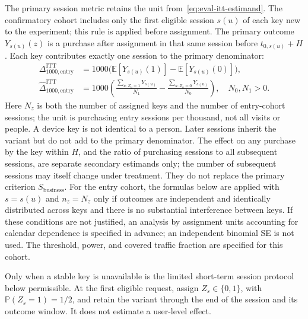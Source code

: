 \documentclass[12pt,a4paper]{article}
\newcommand{\E}{\mathbb E}
\newcommand{\Prob}{\mathbb P}
\theoremstyle{plainru}
\begin{document}
The primary session metric retains the unit from~\eqref{eq:eval-itt-estimand}.
The confirmatory cohort includes only the first eligible session
$s(u)$ of each key new to the experiment; this rule is applied
before assignment. The primary outcome $Y_{s(u)}(z)$ is a purchase after assignment
in that same session before $t_{0,s(u)}+H$. Each key contributes exactly one
session to the primary denominator:
\begin{align}\label{eq:eval-unit-itt}
\Delta_{1000,\mathrm{entry}}^{\mathrm{ITT}}
&=1000\bigl(\E[Y_{s(u)}(1)]-\E[Y_{s(u)}(0)]\bigr),\nonumber\\
\widehat\Delta_{1000,\mathrm{entry}}^{\mathrm{ITT}}
&=1000\left(\frac{\sum_{u:Z_u=1}Y_{s(u)}}{N_1}
             -\frac{\sum_{u:Z_u=0}Y_{s(u)}}{N_0}\right),\quad N_0,N_1>0.
\end{align}
Here $N_z$ is both the number of assigned keys and the number of entry-cohort
sessions; the unit is purchasing entry sessions per thousand, not all visits
or people. A device key is not identical to a person. Later sessions
inherit the variant but do not add to the primary denominator. The effect on
any purchase by the key within $H$, and the ratio of purchasing sessions to all
subsequent sessions, are separate secondary estimands only;
the number of subsequent sessions may itself change under treatment.
They do not replace the primary criterion $S_{\mathrm{business}}$.
For the entry cohort, the formulas below are applied with $s=s(u)$ and $n_z=N_z$
only if outcomes are independent and identically distributed across keys
and there is no substantial interference between keys. If these conditions
are not justified, an analysis by assignment units accounting for
calendar dependence is specified in advance; an independent binomial SE is not used.
The threshold, power, and covered traffic fraction are specified for this cohort.

Only when a stable key is unavailable is the limited
short-term session protocol below permissible. At the first eligible request,
assign $Z_s\in\{0,1\}$, with $\Prob(Z_s=1)=1/2$, and retain the variant
through the end of the session and its outcome window. It does not estimate a user-level effect.
\end{document}

